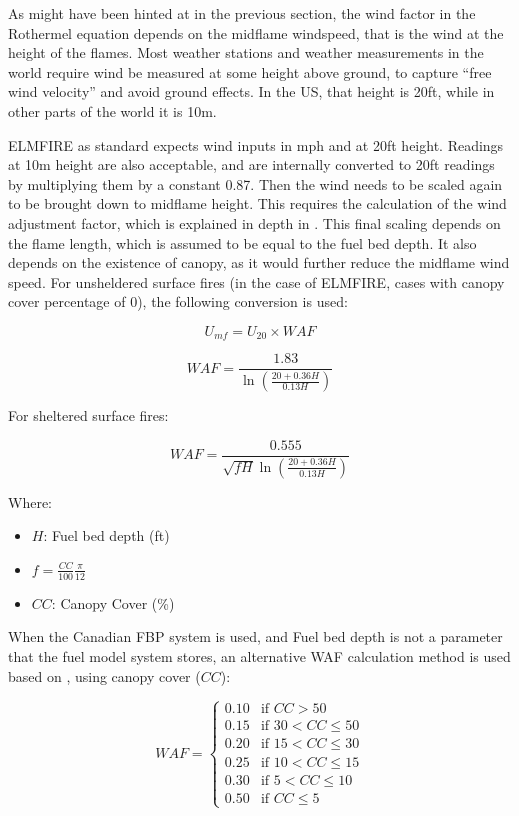 As might have been hinted at in the previous section, the wind factor in the Rothermel equation depends on the midflame windspeed, that is the wind at the height of the flames. Most weather stations and weather measurements in the world require wind be measured at some height above ground, to capture ``free wind velocity'' and avoid ground effects. In the US, that height is 20ft, while in other parts of the world it is 10m. 

ELMFIRE as standard expects wind inputs in mph and at 20ft height. Readings at 10m height are also acceptable, and are internally converted to 20ft readings by multiplying them by a constant 0.87. Then the wind needs to be scaled again to be brought down to midflame height. This requires the calculation of the wind adjustment factor, which is explained in depth in \cite{andrewsModelingWindAdjustment2012}. This final scaling depends on the flame length, which is assumed to be equal to the fuel bed depth. It also depends on the existence of canopy, as it would further reduce the midflame wind speed. For unsheldered surface fires (in the case of ELMFIRE, cases with canopy cover percentage of 0), the following conversion is used:

\[
U_{mf} = U_{20} \times WAF
\]

\begin{equation}
   WAF = \frac{1.83}{\ln\left(\frac{20+0.36H}{0.13H}\right)}
\end{equation}

For sheltered surface fires:

\begin{equation}
    WAF = \frac{0.555}{\sqrt{fH}\ln\left(\frac{20+0.36H}{0.13H}\right)}
\end{equation}

Where:

\begin{itemize}
    \item $H$: Fuel bed depth (ft)
    \item $f=\frac{CC}{100}\frac{\pi}{12}$
    \item $CC$: Canopy Cover (\%)
\end{itemize}

When the Canadian FBP system is used, and Fuel bed depth is not a parameter that the fuel model system stores, an alternative WAF calculation method is used based on \cite{scottNomographsEstimatingSurface2007}, using canopy cover ($CC$):

\[
WAF =
\begin{cases}
0.10 & \text{if } CC > 50 \\
0.15 & \text{if } 30 < CC \le 50 \\
0.20 & \text{if } 15 < CC \le 30 \\
0.25 & \text{if } 10 < CC \le 15 \\
0.30 & \text{if } 5 < CC \le 10 \\
0.50 & \text{if } CC \le 5
\end{cases}
\]

